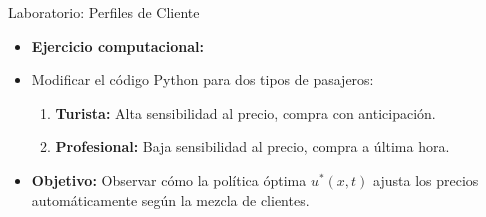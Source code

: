 \documentclass[handout]{beamer}
\begin{document}
\begin{frame}{Laboratorio: Perfiles de Cliente}
\begin{itemize}
    \item \textbf{Ejercicio computacional:}
    \item Modificar el código Python para dos tipos de pasajeros:
    \begin{enumerate}
        \item \textbf{Turista:} Alta sensibilidad al precio, compra con anticipación.
        \item \textbf{Profesional:} Baja sensibilidad al precio, compra a última hora.
    \end{enumerate}
    \item \textbf{Objetivo:} Observar cómo la política óptima $u^*(x,t)$ ajusta los precios automáticamente según la mezcla de clientes.
\end{itemize}
\end{frame}
\end{document}
